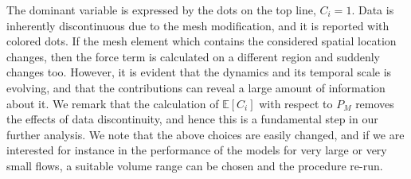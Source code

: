 \documentclass{article}
\begin{document}
The dominant variable is expressed by the dots on the top line, $C_i=1$. Data is inherently discontinuous due to the mesh modification, and it is reported with colored dots. If the mesh element which contains the considered spatial location changes, then the force term is calculated on a different region and suddenly changes too. However, it is evident that the dynamics and its temporal scale is evolving, and that the  contributions can reveal a large amount of information about it. We remark that the calculation of $\mathbb E[C_i]$ with respect to $P_M$ removes the effects of data discontinuity, and hence this is a fundamental step in our further analysis. We note that the above choices are easily changed, and if we are interested for instance in the performance of the models for very large or very small flows, a suitable volume range can be chosen and the procedure re-run.
\end{document}

